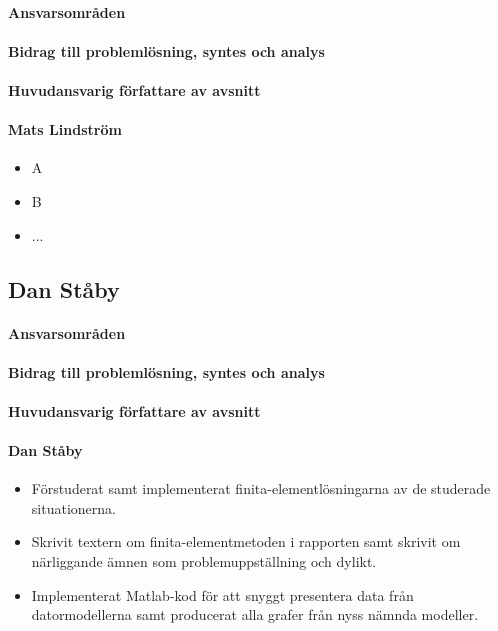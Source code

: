 \documentclass[12pt,a4paper]{article}
\begin{document}
\paragraph{Ansvarsområden}

\paragraph{Bidrag till problemlösning, syntes och analys}

\paragraph{Huvudansvarig författare av avsnitt}


\paragraph{Mats Lindström}
\begin{itemize}
\item A
\item B
\item ...
\end{itemize}



\subsection*{Dan Ståby}

\paragraph{Ansvarsområden}

\paragraph{Bidrag till problemlösning, syntes och analys}

\paragraph{Huvudansvarig författare av avsnitt}

\paragraph{Dan Ståby}
\begin{itemize}
\item Förstuderat samt implementerat finita-elementlösningarna av de studerade situationerna.
\item Skrivit textern om finita-elementmetoden i rapporten samt skrivit om närliggande ämnen som problemuppställning och dylikt. 
\item Implementerat Matlab-kod för att snyggt presentera data från datormodellerna samt producerat alla grafer från
nyss nämnda modeller.
\end{itemize}
\end{document}
